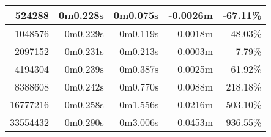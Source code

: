 \documentclass[documentation.tex]{subfiles}
\begin{document}
\begin{longtable}{|r|r|r|r|r|}
        524288                                                                                                                    & 0m0.228s                        & 0m0.075s                                                                       & {\color[HTML]{FF0000} -0.0026m}                       & {\color[HTML]{FF0000} -67.11\%}                        \\ \hline
        1048576                                                                                                                   & 0m0.229s                        & 0m0.119s                                                                       & {\color[HTML]{FF0000} -0.0018m}                       & {\color[HTML]{FF0000} -48.03\%}                        \\ \hline
        2097152                                                                                                                   & 0m0.231s                        & 0m0.213s                                                                       & {\color[HTML]{FF0000} -0.0003m}                       & {\color[HTML]{FF0000} -7.79\%}                         \\ \hline
        4194304                                                                                                                   & 0m0.239s                        & 0m0.387s                                                                       & {\color[HTML]{32CB00} 0.0025m}                        & {\color[HTML]{32CB00} 61.92\%}                         \\ \hline
        8388608                                                                                                                   & 0m0.242s                        & 0m0.770s                                                                       & {\color[HTML]{32CB00} 0.0088m}                        & {\color[HTML]{32CB00} 218.18\%}                        \\ \hline
        16777216                                                                                                                  & 0m0.258s                        & 0m1.556s                                                                       & {\color[HTML]{32CB00} 0.0216m}                        & {\color[HTML]{32CB00} 503.10\%}                        \\ \hline
        33554432                                                                                                                  & 0m0.290s                        & 0m3.006s                                                                       & {\color[HTML]{32CB00} 0.0453m}                        & {\color[HTML]{32CB00} 936.55\%}                        \\ \hline

\end{longtable}
\end{document}
